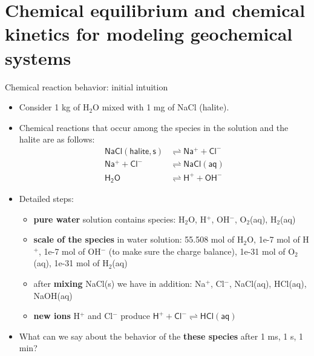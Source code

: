 \section{Chemical equilibrium and chemical kinetics for modeling geochemical
systems}


\begin{frame}{Chemical reaction behavior: initial intuition}
\begin{itemize}
\item Consider 1 kg of H$_{2}$O mixed with 1 mg of NaCl (halite). 
\item Chemical reactions that occur among the species in the solution and the halite are as follows:\\[-30pt]
\begin{align*}
\mathsf{NaCl(halite, s)} & \rightleftharpoons\mathsf{Na^{+}+Cl^{-}}\\
\mathsf{Na^{+}+Cl^{-}} & \rightleftharpoons\mathsf{NaCl(aq)}\\
\mathsf{H_{2}O} & \rightleftharpoons\mathsf{H^{+}+OH^{-}}
\end{align*}
\item Detailed steps: 
\begin{itemize}
\item \textbf{pure water} solution contains species: H$_2$O, H$^+$, OH$^-$, O$_2$(aq), H$_2$(aq)
\item \textbf{scale of the species} in water solution: 
55.508 mol of H$_2$O, 1e-7 mol of H$^+$, 1e-7 mol of OH$^-$ (to make sure the charge balance),
 1e-31 mol of O$_2$(aq),  1e-31 mol of H$_2$(aq) 
\item after \textbf{mixing} NaCl(s) we have in addition: Na$^{+}$, Cl$^{-}$, NaCl(aq), HCl(aq), NaOH(aq)
\item  \textbf{new ions} H$^+$ and Cl$^{-}$ produce $\mathsf{H^{+}+Cl^{-}} \rightleftharpoons \mathsf{HCl(aq)}$
\end{itemize}
\end{itemize}

\pause{}
\begin{itemize}
\item What can we say about the behavior of the \textbf{\alert{\textbf{these species}}} after 1 ms, 1 s, 1 min?
\end{itemize}
\end{frame}
%



